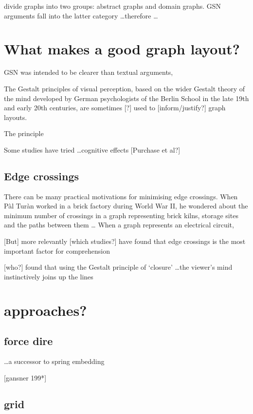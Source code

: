 \documentclass[authoryearcitations]{UoYCSproject}
\begin{document}
\citet{huang2007effects} divide graphs into two groups: abstract graphs and domain graphs.
GSN arguments fall into the latter category \ldots  therefore \ldots
{}


\section{What makes a good graph layout?}


GSN was intended to be clearer than textual arguments, 

The Gestalt principles of visual perception,
based on the wider Gestalt theory of the mind developed by German psychologists of the Berlin School in the late 19th and early 20th centuries,
are sometimes [?] used to [inform/justify?] graph layouts.

The principle 

Some studies have tried \ldots cognitive effects [Purchase et al?]

\subsection{Edge crossings}

There can be many practical motivations for minimising edge crossings.
When P\`{a}l Tur\`{a}n worked in a brick factory during World War II,
he wondered about the minimum number of crossings in a graph representing
brick kilns, storage sites and the paths between them \ldots
When a graph represents an electrical circuit, 

[But] more relevantly [which studies?] have found that edge crossings is the most important factor for comprehension

[who?] found that using the Gestalt principle of `closure' \ldots the viewer's mind instinctively joins up the lines

\section{approaches?}

\subsection{force dire}

\ldots a successor to \citet{tutte} spring embedding

[gansner 199*]

\subsection{grid}
\end{document}
